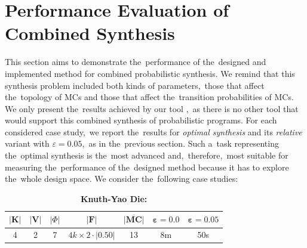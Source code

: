 \section{Performance Evaluation of Combined Synthesis}
This section aims to demonstrate the~performance of the~designed and implemented method for combined probabilistic synthesis.
We remind that this synthesis problem included both kinds of parameters,~those that affect the~topology of MCs and those that affect the~transition probabilities of MCs.
We only present the~results achieved by our tool \toolname{},~as there is no other tool that would support this combined synthesis of probabilistic programs.
For each considered case study,~we report the~results for \textit{optimal synthesis} and its \textit{relative} variant with $\varepsilon = 0.05$,~as in the~previous section.
Such a~task representing the~optimal synthesis is the~most advanced and,~therefore,~most suitable for measuring the~performance of the~designed method because it has to explore the~whole design space.
We consider the~following case studies:

\begin{table}[h!]
\centering
\begin{tabular}{|c|c|c|c|c|c|c|}
\hline
$\lvert \mathbf{K} \rvert$ & $\lvert \mathbf{V} \rvert$ & $\lvert \varPhi \rvert$ & $\lvert \mathcal{\mathbf{F}} \rvert$ & $\overline{\mathbf{\lvert MC \rvert}}$ & $\mathbf{\varepsilon = 0.0}$ & $\mathbf{\varepsilon = 0.05}$ \\ \hline
4 & 2 & 7 & $4k \times 2 \cdot \lvert 0.50 \rvert$ & 13 & 8m & 50s \\ \hline
\end{tabular}
\caption{\textbf{Knuth-Yao Die:}}
\end{table}

